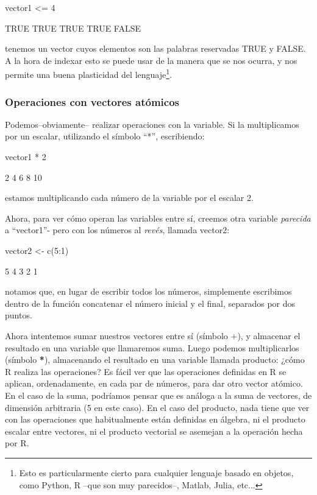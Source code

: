 \documentclass[11pt,a4paper]{article}
\begin{document}
\begin{Schunk}
\begin{Sinput}
vector1 <= 4
\end{Sinput}
\begin{Soutput}
[1] TRUE TRUE TRUE TRUE FALSE
\end{Soutput}
\end{Schunk}

\noindent tenemos un vector cuyos elementos son las palabras reservadas TRUE y FALSE. A la hora de indexar esto se puede usar de la manera que se nos ocurra, y nos permite una buena plasticidad del lenguaje\footnote{Esto es particularmente cierto para cualquier lenguaje basado en objetos, como Python, R --que son muy parecidos--, Matlab, Julia, etc...}.



\subsubsection{Operaciones con vectores atómicos}

Podemos--obviamente-- realizar operaciones con la variable. Si la multiplicamos por un escalar, utilizando el símbolo ``*'', escribiendo:

\begin{Schunk}
\begin{Sinput}
vector1 * 2
\end{Sinput}
\begin{Soutput}
[1]  2  4  6  8 10
\end{Soutput}
\end{Schunk}

\noindent estamos multiplicando cada número de la variable por el escalar 2.

Ahora, para ver cómo operan las variables entre sí, creemos otra variable \textit{parecida} a ``vector1''- pero con los números al \textit{revés}, llamada vector2:
\begin{Schunk}
\begin{Sinput}
vector2 <- c(5:1)
\end{Sinput}
\begin{Soutput}
[1] 5 4 3 2 1
\end{Soutput}
\end{Schunk}

\noindent notamos que, en lugar de escribir todos los números, simplemente escribimos dentro de la función concatenar el número inicial y el final, separados por dos puntos.

Ahora intentemos sumar nuestros vectores entre sí (símbolo $\mathbf{+}$), y almacenar el resultado en una variable que llamaremos suma. Luego podemos multiplicarlos (símbolo \textbf{*}), almacenando el resultado en una variable llamada producto: ¿cómo R realiza las operaciones? Es fácil ver que las operaciones definidas en R se aplican, ordenadamente, en cada par de números, para dar otro vector atómico. En el caso de la suma, podríamos pensar que es análoga a la suma de vectores, de dimensión arbitraria (5 en este caso). En el caso del producto, nada tiene que ver con las operaciones que habitualmente están definidas en álgebra, ni el producto escalar entre vectores, ni el producto vectorial se asemejan a la operación hecha por R.
\end{document}

